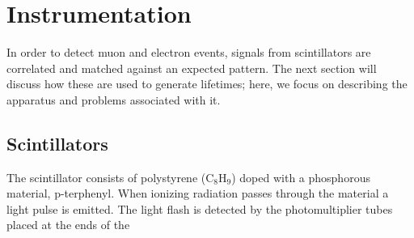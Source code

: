 \section{Instrumentation}

In order to detect muon and electron events, signals from scintillators are correlated and matched against an expected pattern. The next section will discuss how these are used to generate lifetimes; here, we focus on describing the apparatus and problems associated with it.

\subsection{Scintillators}

The scintillator consists of polystyrene ($\mathrm{C}_{8}\mathrm{H}_{9}$) doped with a phosphorous material, p-terphenyl. When ionizing radiation passes through the material a light pulse is emitted. The light flash is detected by the photomultiplier tubes placed at the ends of the 